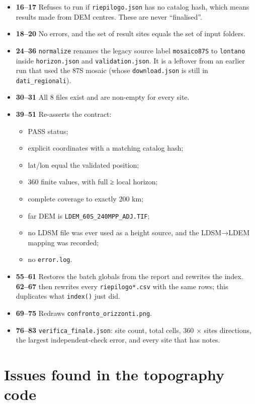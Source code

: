 \documentclass[11pt,a4paper]{article}
\providecommand{\tightlist}{\setlength{\itemsep}{0pt}\setlength{\parskip}{0pt}}
\begin{document}
\begin{itemize}
\tightlist
\item
  \textbf{16--17} Refuses to run if
  \texttt{riepilogo.json} has no catalog hash, which
  means results made from DEM centres. These are never ``finalised''.
\item
  \textbf{18--20} No errors, and the set of result sites equals the set
  of input folders.
\item
  \textbf{24--36} \texttt{normalize} renames the legacy
  source label \texttt{mosaico87S} to
  \texttt{lontano} inside
  \texttt{horizon.json} and
  \texttt{validation.json}. It is a leftover from an
  earlier run that used the 87S mosaic (whose
  \texttt{download.json} is still in
  \texttt{dati\_regionali}).
\item
  \textbf{30--31} All 8 files exist and are non-empty for every site.
\item
  \textbf{39--51} Re-asserts the contract:

  \begin{itemize}
  \tightlist
  \item
    PASS status;
  \item
    explicit coordinates with a matching catalog hash;
  \item
    lat/lon equal the validated position;
  \item
    360 finite values, with full ≥ local horizon;
  \item
    complete coverage to exactly 200 km;
  \item
    far DEM is \texttt{LDEM\_60S\_240MPP\_ADJ.TIF};
  \item
    no LDSM file was ever used as a height source, and the LDSM→LDEM
    mapping was recorded;
  \item
    no \texttt{error.log}.
  \end{itemize}
\item
  \textbf{55--61} Restores the batch globals from the report and
  rewrites the index. \textbf{62--67} then rewrites every
  \texttt{riepilogo*.csv} with the same rows; this
  duplicates what \texttt{index()} just did.
\item
  \textbf{69--75} Redraws
  \texttt{confronto\_orizzonti.png}.
\item
  \textbf{76--83} \texttt{verifica\_finale.json}: site
  count, total cells, 360 × sites directions, the largest
  independent-check error, and every site that has notes.
\end{itemize}

\hypertarget{issues-found-in-the-topography-code}{%
\section{Issues found in the topography
code}\label{issues-found-in-the-topography-code}}
\end{document}
